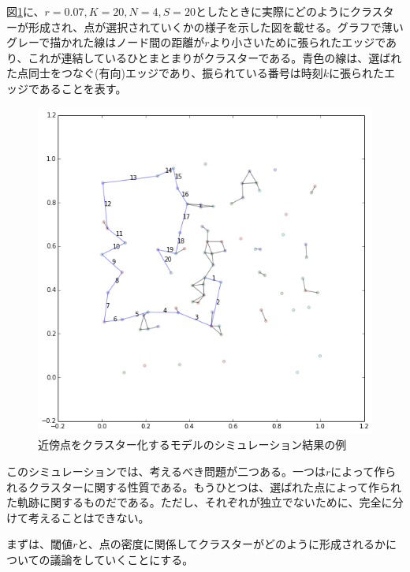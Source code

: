 図\ref{fig:f15}に、$r=0.07, K=20, N=4, S=20$としたときに実際にどのようにクラスターが形成され、点が選択されていくかの様子を示した図を載せる。グラフで薄いグレーで描かれた線はノード間の距離が$r$より小さいために張られたエッジであり、これが連結しているひとまとまりがクラスターである。青色の線は、選ばれた点同士をつなぐ(有向)エッジであり、振られている番号は時刻$k$に張られたエッジであることを表す。
\begin{figure}[H]
    \begin{center}
        \includegraphics[width=12.5cm]{../img/cluster.png}
        \caption{近傍点をクラスター化するモデルのシミュレーション結果の例}
        \label{fig:f15}
    \end{center}
\end{figure}

このシミュレーションでは、考えるべき問題が二つある。一つは$r$によって作られるクラスターに関する性質である。もうひとつは、選ばれた点によって作られた軌跡に関するものだである。ただし、それぞれが独立でないために、完全に分けて考えることはできない。

まずは、閾値$r$と、点の密度に関係してクラスターがどのように形成されるかについての議論をしていくことにする。

